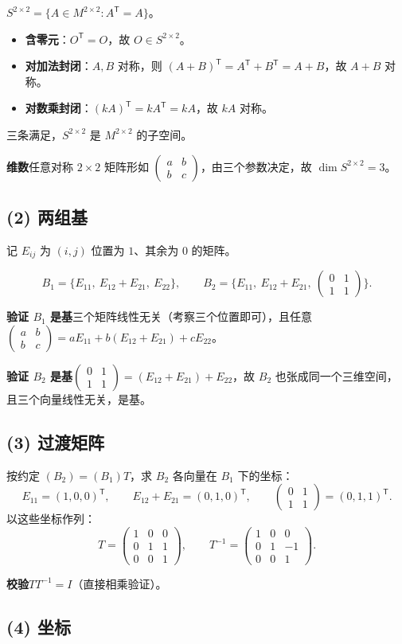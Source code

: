 \documentclass[11pt]{ctexart}
\newcommand{\TT}{^{\mathsf T}}
\newcommand{\bv}[1]{\begin{pmatrix}#1\end{pmatrix}}
\begin{document}
$S^{2\times2}=\{A\in M^{2\times2}:A\TT=A\}$。

\begin{itemize}
\item \textbf{含零元}：$O\TT=O$，故 $O\in S^{2\times2}$。
\item \textbf{对加法封闭}：$A,B$ 对称，则 $(A+B)\TT=A\TT+B\TT=A+B$，故 $A+B$ 对称。
\item \textbf{对数乘封闭}：$(kA)\TT=kA\TT=kA$，故 $kA$ 对称。
\end{itemize}

三条满足，$S^{2\times2}$ 是 $M^{2\times2}$ 的子空间。

\textbf{维数}\quad 任意对称 $2\times2$ 矩阵形如 $\bv{a&b\\b&c}$，由三个参数决定，故 $\dim S^{2\times2}=3$。

\subsection*{(2) 两组基}

记 $E_{ij}$ 为 $(i,j)$ 位置为 $1$、其余为 $0$ 的矩阵。

\[
B_1=\{E_{11},\ E_{12}+E_{21},\ E_{22}\},\qquad
B_2=\{E_{11},\ E_{12}+E_{21},\ \bv{0&1\\1&1}\}.
\]

\textbf{验证 $B_1$ 是基}\quad 三个矩阵线性无关（考察三个位置即可），且任意 $\bv{a&b\\b&c}=aE_{11}+b(E_{12}+E_{21})+cE_{22}$。

\textbf{验证 $B_2$ 是基}\quad $\bv{0&1\\1&1}=(E_{12}+E_{21})+E_{22}$，故 $B_2$ 也张成同一个三维空间，
且三个向量线性无关，是基。

\subsection*{(3) 过渡矩阵}

按约定 $(B_2)=(B_1)T$，求 $B_2$ 各向量在 $B_1$ 下的坐标：
\[
E_{11}=(1,0,0)\TT,\qquad E_{12}+E_{21}=(0,1,0)\TT,\qquad \bv{0&1\\1&1}=(0,1,1)\TT .
\]
以这些坐标作列：
\[
T=\bv{1&0&0\\0&1&1\\0&0&1},\qquad T^{-1}=\bv{1&0&0\\0&1&-1\\0&0&1}.
\]

\textbf{校验}\quad $TT^{-1}=I$（直接相乘验证）。

\subsection*{(4) 坐标}
\end{document}
